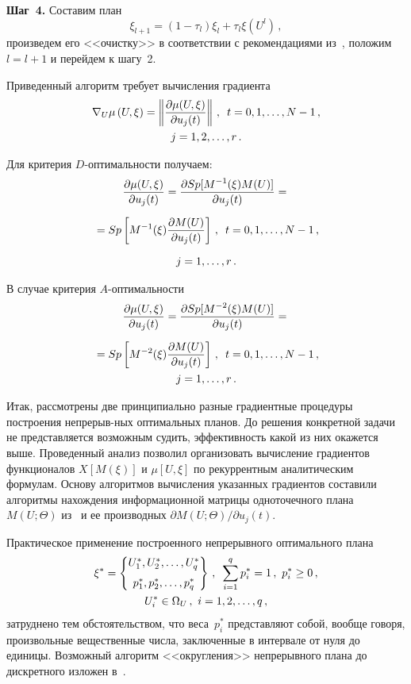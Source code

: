 \begin{multicols}{2}
\smallskip\textbf{Шаг~4.} Составим план
  $$
  \xi_{l+1}=\left (1-\tau_l\right)\xi_l+\tau_l\xi\left(U^l\right)\,,
  $$
произведем его <<очистку>> в соответствии с рекомендациями из~\cite{4-c},
положим $l=l+1$ и перейдем к шагу~2.

  Приведенный алгоритм требует вычисления градиента
  \begin{multline*}
  \nabla_U \mu\left(U,\xi\right) =\left\Vert \displaystyle\frac{\displaystyle \partial\mu(U,\xi)\mathstrut}{\displaystyle \partial
u_j(t)\mathstrut}\right\Vert\,,\enskip t=0,1, \ldots ,N-1\,,\\  j=1,2, \ldots ,r\,.
  \end{multline*}

  Для критерия $D$-опти\-маль\-ности получаем:
  \begin{multline*}
  \displaystyle\frac{\displaystyle \partial\mu(U,\xi)\mathstrut}{\displaystyle \partial u_j(t)\mathstrut} =\displaystyle\frac{\displaystyle \partial
  Sp[M^{-1}(\xi)M(U)]\mathstrut}{\displaystyle \partial u_j(t)\mathstrut}= {}\\[6pt]
  {}=Sp\left[ M^{-1}(\xi)\displaystyle\frac{\displaystyle \partial
M(U)\mathstrut}{\displaystyle \partial u_j(t)\mathstrut}\right]\,, \enskip t=0,1, \ldots ,N-1\,, \\[6pt]
j=1, \ldots ,r\,.
  \end{multline*}

  В случае критерия $A$-опти\-маль\-ности
    \begin{multline*}
  \displaystyle\frac{\displaystyle \partial\mu(U,\xi)\mathstrut}{\displaystyle \partial u_j(t)\mathstrut} =\displaystyle\frac{\displaystyle \partial
  Sp[M^{-2}(\xi)M(U)]\mathstrut}{\displaystyle \partial u_j(t)\mathstrut}={}\\[6pt]
  {}=Sp\left[ M^{-2}(\xi)\displaystyle\frac{\displaystyle \partial
M(U)\mathstrut}{\displaystyle \partial u_j(t)\mathstrut}\right]\,, \enskip t=0,1, \ldots ,N-1\,, \\ j=1, \ldots ,r\,.
    \end{multline*}

   Итак, рассмотрены две принципиально разные градиентные процедуры
построения непрерыв-\linebreak ных оптимальных планов. До решения конкретной задачи
не представляется возможным судить, эффективность какой из них окажется
выше. Проведенный анализ позволил организовать вычисление градиентов
функционалов $X[M(\xi)]$ и $\mu[U,\xi]$ по рекуррентным аналитическим
формулам. Основу алгоритмов вычисления указанных градиентов составили
алгоритмы нахождения информационной матрицы одноточечного плана
$M(U;\Theta)$ из~\cite{19-c} и ее производных $\partial M(U;\Theta)/\partial
u_j(t)$.

  Практическое применение построенного непрерывного оптимального плана
\begin{multline*}
  \xi^*=\left\{
  \begin{matrix}
  U_1^*, U_2^*, \ldots , U_q^*\\[6pt]
  p_1^*, p_2^*, \ldots , p_q^*
  \end{matrix}
  \right \}\,,\enskip \sum\limits_{i=1}^q p_i^*=1\,,\ p_i^*\geq 0\,,\\ U_i^*\in
\Omega_U\,,\ i=1, 2, \ldots , q\,,
  \end{multline*}
затруднено тем обстоятельством, что веса~$p_i^*$ представляют собой, вообще
говоря, произвольные вещественные числа, заключенные в интервале от нуля
до единицы. Возможный алгоритм <<округления>> непрерывного плана до
дискретного изложен в~\cite{6-c}.


\end{multicols}
